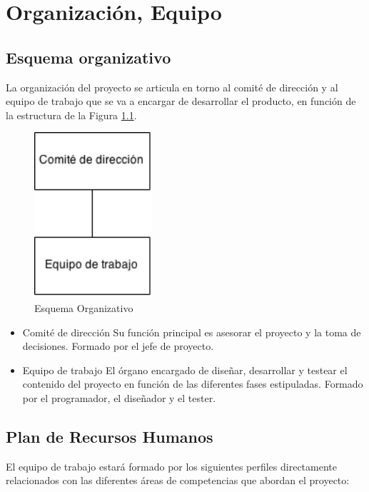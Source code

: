 \chapter{Organización, Equipo}

\section{Esquema organizativo}

La organización del proyecto se articula en torno al comité de dirección y al equipo de trabajo que se va a encargar de desarrollar el producto, en función de la estructura de la Figura \ref{fig:esqOrg}.

\begin{figure}[!htp]
	\centering
	\includegraphics[scale=.75]{fig/esq}
	\caption{Esquema Organizativo}
	\label{fig:esqOrg}
\end{figure}

\begin{itemize}
	\item Comité de dirección 
	Su función principal es asesorar el proyecto y la toma de decisiones. Formado por el jefe de proyecto.
	\item Equipo de trabajo
	El órgano encargado de diseñar, desarrollar y testear el contenido del proyecto en función de las diferentes fases estipuladas. Formado por el programador, el diseñador y el tester.
\end{itemize}

\section{Plan de Recursos Humanos}
\label{sec:planRecursosHumanos}

El equipo de trabajo estará formado por los siguientes perfiles directamente relacionados con las diferentes áreas de competencias que abordan el proyecto:

